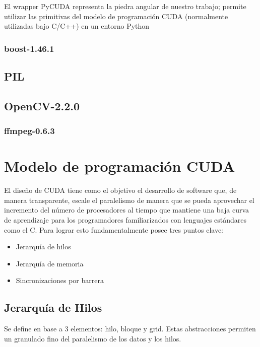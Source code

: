 \documentclass[twoside]{article}
\begin{document}
El wrapper PyCUDA representa la piedra angular de nuestro trabajo; permite utilizar las primitivas del modelo de programación CUDA (normalmente utilizadas bajo C/C++) en un entorno Python

\subsubsection{boost-1.46.1}

\subsection{PIL}

\subsection{OpenCV-2.2.0}

\subsubsection{ffmpeg-0.6.3}


\section{Modelo de programación CUDA}

El diseño de CUDA tiene como el objetivo el desarrollo de software que, de manera transparente, escale el paralelismo de manera que se pueda aprovechar el incremento del número de procesadores al tiempo que mantiene una baja curva de aprendizaje para los programadores familiarizados con lenguajes estándares como el C. Para lograr esto fundamentalmente posee tres puntos clave:

\begin{itemize}
   \item Jerarquía de hilos
   \item Jerarquía de memoria
   \item Sincronizaciones por barrera
\end{itemize}

\subsection{Jerarquía de Hilos}

Se define en base a 3 elementos: hilo, bloque y grid. Estas abstracciones permiten un granulado fino del paralelismo de los datos y los hilos.
\end{document}
